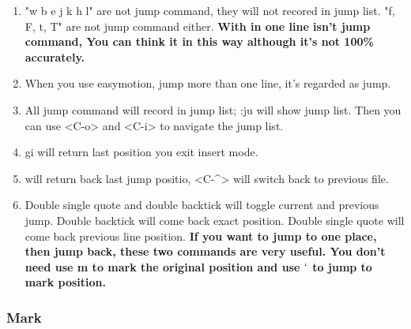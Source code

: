 \documentclass[a4paper,11pt,twoside]{book}
\begin{document}
\begin{itemize}
\begin{enumerate}
		\item "w b e j k h l" are not jump command, they will not recored in jump list. "f, F, t, T" are not jump command either.  \textbf{With in one line isn't jump command, You can think it in this way although it's not 100\% accurately.}

		\item When you use easymotion, jump more than one line, it's regarded as jump.

		\item All jump command will record in jump list; :ju will show jump list. Then you can use <C-o> and <C-i> to navigate the jump list. 
		
		\item gi will return last position you exit insert mode.
				
		\item <C-o> will return back last jump positio, <C-\^{}> will switch back to previous file. 

		\item Double single quote and double backtick will toggle current and previous jump. Double backtick will come back exact position. Double single quote will come back previous line position.  \textbf{If you want to jump to one place, then jump back, these two commands are very useful. You don't need use m to mark the original position and use $`$ to jump to mark position.}

\end{enumerate}
\end{itemize}

\subsubsection{Mark}
\end{document}
